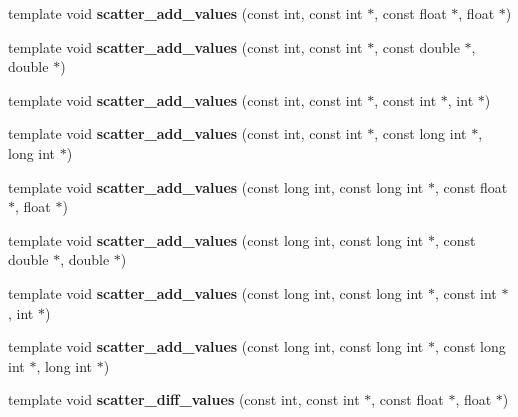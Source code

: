 \begin{DoxyCompactItemize}
\item 
\mbox{\label{namespaceschwz_a5f049658ff61cb915da9215e10b42ecc}} 
template void {\bfseries scatter\+\_\+add\+\_\+values} (const int, const int $\ast$, const float $\ast$, float $\ast$)
\item 
\mbox{\label{namespaceschwz_a1a15b2c2b084f065b99bcae1bd055ca1}} 
template void {\bfseries scatter\+\_\+add\+\_\+values} (const int, const int $\ast$, const double $\ast$, double $\ast$)
\item 
\mbox{\label{namespaceschwz_ac501d1bffab5f31ad4cc9c63ec4bad86}} 
template void {\bfseries scatter\+\_\+add\+\_\+values} (const int, const int $\ast$, const int $\ast$, int $\ast$)
\item 
\mbox{\label{namespaceschwz_adeea7daa5b0f92d1b09e55720fa63bb6}} 
template void {\bfseries scatter\+\_\+add\+\_\+values} (const int, const int $\ast$, const long int $\ast$, long int $\ast$)
\item 
\mbox{\label{namespaceschwz_a08d3a3036763cfa75d455f6b71844cb3}} 
template void {\bfseries scatter\+\_\+add\+\_\+values} (const long int, const long int $\ast$, const float $\ast$, float $\ast$)
\item 
\mbox{\label{namespaceschwz_ac1dc2225592f5f39274b6cf7dd6a5117}} 
template void {\bfseries scatter\+\_\+add\+\_\+values} (const long int, const long int $\ast$, const double $\ast$, double $\ast$)
\item 
\mbox{\label{namespaceschwz_a632ab20939f9053831bf45bf6a426ad8}} 
template void {\bfseries scatter\+\_\+add\+\_\+values} (const long int, const long int $\ast$, const int $\ast$, int $\ast$)
\item 
\mbox{\label{namespaceschwz_a6c2e0122e5402b8f4d92358983aee12e}} 
template void {\bfseries scatter\+\_\+add\+\_\+values} (const long int, const long int $\ast$, const long int $\ast$, long int $\ast$)
\item 
\mbox{\label{namespaceschwz_ad1434310b9a8066f5b4c2addea42ac14}} 
template void {\bfseries scatter\+\_\+diff\+\_\+values} (const int, const int $\ast$, const float $\ast$, float $\ast$)

\end{DoxyCompactItemize}
